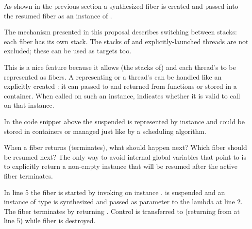 
\label{representation}
As shown in the previous section a synthesized fiber is created and passed
into the resumed fiber as an instance of \fiber.


The mechanism presented in this proposal describes switching between stacks: each
fiber has its own stack. The stacks of \main and explicitly-launched threads
are not excluded; these can be used as targets too.


This is a nice feature because it allows (the stacks of) \main and each
thread's \entryfn to be represented as fibers. A \fiber
representing \main or a thread's \entryfn can be handled like an
explicitly created \fiber: it can passed to and returned from functions or
stored in a container. When called on such an instance, \canxtresume indicates
whether it is valid to call \xtresumesome on that instance.

In the code snippet above the suspended \main is represented by instance
 and could be stored in containers or managed just like 
by a scheduling algorithm.


 When a fiber returns (terminates), what
should happen next? Which fiber should be resumed next? The only way to avoid
internal global variables that point to \main is to explicitly return a non-empty
\fiber instance that will be resumed after the active fiber terminates.

In line 5 the fiber is started by invoking \resume on instance . \main
is suspended and an instance of type  is synthesized and passed as
parameter  to the lambda at line 2. The fiber terminates by returning
. Control is transferred to \main (returning from  at
line 5) while fiber  is destroyed.

